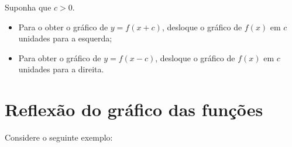 \begin{obs}
Suponha que $c>0$.
\begin{itemize}
    \item Para o obter o gráfico de $y=f(x+c)$, desloque o gráfico de $f(x)$ em $c$ unidades para a esquerda;
    \item Para obter o gráfico de $y=f(x-c)$, desloque o gráfico de $f(x)$ em $c$ unidades para a direita.
\end{itemize}
\end{obs}





 \section{Reflexão do gráfico das funções}


Considere o seguinte exemplo:

